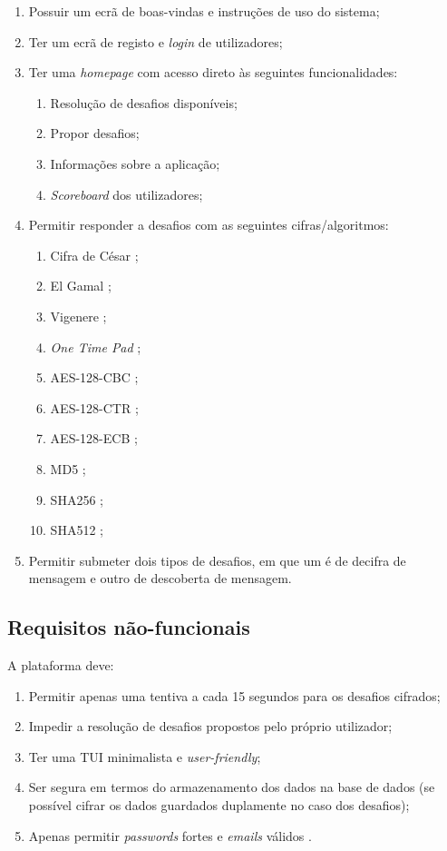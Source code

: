 \begin{enumerate}
    \item Possuir um ecrã de boas-vindas e instruções de uso do sistema;
    \item Ter um ecrã de registo e \emph{login} de utilizadores;
    \item Ter uma \textit{homepage} com acesso direto às seguintes funcionalidades:
    \begin{enumerate}
        \item Resolução de desafios disponíveis;
        \item Propor desafios;
        \item Informações sobre a aplicação;
        \item \textit{Scoreboard} dos utilizadores;
    \end{enumerate}
    \item Permitir responder a desafios com as seguintes cifras/algoritmos:
    \begin{enumerate}
        \item Cifra de César \cite{caesar};
        \item El Gamal \cite{elgamal};
        \item Vigenere \cite{vigenere};
        \item \textit{One Time Pad} \cite{otp};
        \item AES-128-CBC \cite{aes,aes-using};
        \item AES-128-CTR \cite{aes,aes-using};
        \item AES-128-ECB \cite{aes,aes-using};
        \item MD5 \cite{hash};
        \item SHA256 \cite{hash};
        \item SHA512 \cite{hash};
    \end{enumerate}
    \item Permitir submeter dois tipos de desafios, em que um é de decifra de mensagem e outro de descoberta de mensagem.
\end{enumerate}


\subsection{Requisitos não-funcionais}
\label{ssec::engsoft:requisitos:nao-funcionais}

A plataforma deve:

\begin{enumerate}
    \item Permitir apenas uma tentiva a cada 15 segundos para os desafios cifrados;
    \item Impedir a resolução de desafios propostos pelo próprio utilizador;
    \item Ter uma \ac{TUI} minimalista e \textit{user-friendly};
    \item Ser segura em termos do armazenamento dos dados na base de dados (se possível cifrar os dados guardados duplamente no caso dos desafios);
    \item Apenas permitir \textit{passwords} fortes \cite{password} e \textit{emails} válidos \cite{valemail}.
\end{enumerate}


